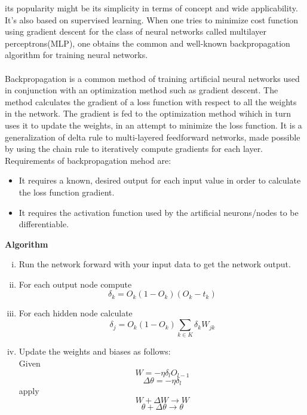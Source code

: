 its popularity might be its simplicity in terms of concept and wide applicability. It's also based on supervised learning. When one tries to minimize cost function
using gradient descent for the class of neural networks called multilayer perceptrons(MLP), one obtains the common and well-known backpropagation algorithm for training neural networks.\\
\\
Backpropagation is a common method of training artificial neural networks used in conjunction with an optimization method such as gradient descent. The 
method calculates the gradient of a loss function with respect to all the weights in the network. The gradient is fed to the optimization method wihich in turn uses it to
update the weights, in an attempt to minimize the loss function. It is a generalization of delta rule to multi-layered feedforward networks, made possible
by using the chain rule to iteratively compute gradients for each layer. Requirements of backpropagation mehod are:
\begin{itemize}
        \item It requires a known, desired output for each input value in order to calculate the loss function gradient.
        \item It requires the activation function used by the artificial neurons/nodes to be differentiable.
\end{itemize}
\textbf{Algorithm}
\begin{enumerate}[(i)]
        \item Run the network forward with your input data to get the network output.
        \item For each output node compute
                \begin{equation}
                        \delta_k = O_k(1 - O_k)(O_k - t_k)
                \end{equation}
        \item For each hidden node calculate
                \begin{equation}
                        \delta_j = O_k(1 - O_k) \sum_{k \in K}{\delta_kW_{jk}}
                \end{equation}
        \item Update the weights and biases as follows:\\
                Given
                \begin{equation}
                        W = -\eta \delta_l O_{l-1}
                \end{equation}
                \begin{equation}
                        \Delta \theta = -\eta \delta_l
                \end{equation}
                apply
                \begin{equation}
                        W + \Delta W \to W
                \end{equation}
                \begin{equation}
                        \theta + \Delta\theta \to \theta
                \end{equation}
\end{enumerate}
